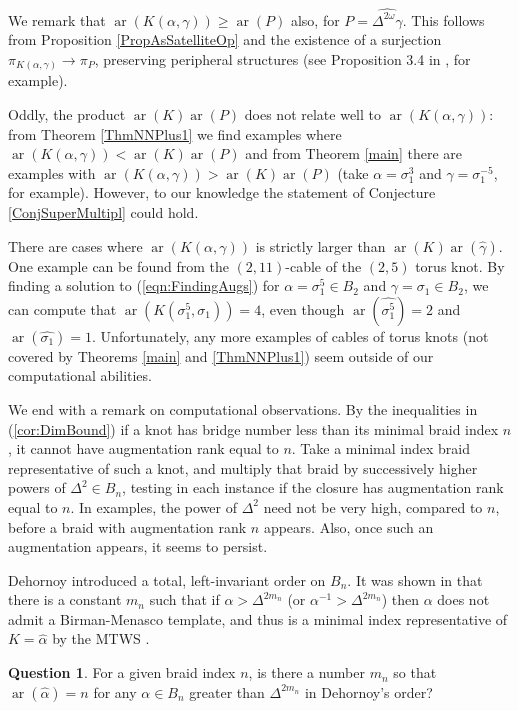 \documentclass[11pt]{amsart}
\def\s{{\sigma}}
\def\ar{\operatorname{ar}}
\theoremstyle{definition}
\begin{document}
We remark that $\ar(K(\alpha,\gamma))\ge \ar(P)$ also, for $P=\widehat{\Delta^{2\omega}\gamma}$. This follows from Proposition \ref{PropAsSatelliteOp} and the existence of a surjection $\pi_{K(\alpha,\gamma)}\to\pi_P$, preserving peripheral structures (see Proposition 3.4 in \cite{SW}, for example). 

Oddly, the product $\ar(K)\ar(P)$ does not relate well to $\ar(K(\alpha,\gamma))$: from Theorem \ref{ThmNNPlus1} we find examples where $\ar(K(\alpha,\gamma))<\ar(K)\ar(P)$ and from Theorem \ref{main} there are examples with $\ar(K(\alpha,\gamma))>\ar(K)\ar(P)$ (take $\alpha=\s_1^3$ and $\gamma=\s_1^{-5}$, for example). However, to our knowledge the statement of Conjecture \ref{ConjSuperMultipl} could hold. 

There are cases where $\ar(K(\alpha,\gamma))$ is strictly larger than $\ar(K)\ar(\hat{\gamma})$. One example can be found from the $(2,11)$-cable of the $(2,5)$ torus knot. By finding a solution to (\ref{eqn:FindingAugs}) for $\alpha = \s_1^5\in B_2$ and $\gamma=\s_1\in B_2$, we can compute that $\ar(K(\s_1^5,\s_1)) = 4$, even though $\ar(\hat{\s_1^5})=2$ and $\ar(\hat{\s_1})=1$. Unfortunately, any more examples of cables of torus knots (not covered by Theorems \ref{main} and \ref{ThmNNPlus1}) seem outside of our computational abilities.

We end with a remark on computational observations. By the inequalities in (\ref{cor:DimBound}) if a knot has bridge number less than its minimal braid index $n$, it cannot have augmentation rank equal to $n$. Take a minimal index braid representative of such a knot, and multiply that braid by successively higher powers of $\Delta^2\in B_n$, testing in each instance if the closure has augmentation rank equal to $n$. In examples, the power of $\Delta^2$ need not be very high, compared to $n$, before a braid with augmentation rank $n$ appears. Also, once such an augmentation appears, it seems to persist. 

Dehornoy introduced a total, left-invariant order on $B_n$. It was shown in \cite{MN} that there is a constant $m_n$ such that if $\alpha>\Delta^{2m_n}$ (or $\alpha^{-1}>\Delta^{2m_n}$) then $\alpha$ does not admit a Birman-Menasco template, and thus is a minimal index representative of $K=\hat\alpha$ by the MTWS \cite{BM_MTWS}. 

\newtheorem*{ques}{Question}
\begin{ques}For a given braid index $n$, is there a number $m_n$ so that $\ar(\hat\alpha)=n$ for any $\alpha\in B_n$ greater than $\Delta^{2m_n}$ in Dehornoy's order?
\end{ques}



\end{document}
